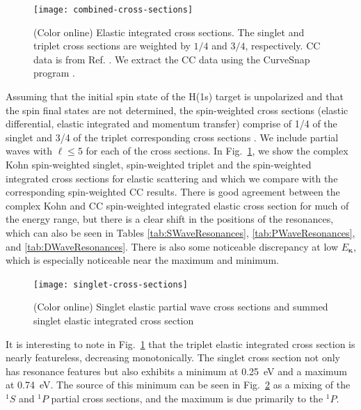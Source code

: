 \documentclass[preprint,showpacs,showkeys,preprintnumbers,amsmath,amssymb,longbibliography,pra,aps]{revtex4-1}
\begin{document}
\begin{figure}[H]
	\centering
	\texttt{[image: combined-cross-sections]}
	\caption{(Color online) Elastic integrated cross sections. The singlet and
triplet cross sections are weighted by $1/4$ and $3/4$,
respectively. CC data is from Ref. \cite{Walters2004}.
We extract the CC data using the
CurveSnap program \cite{CurveSnap}.}
	\label{fig:combined-cross-sections}
\end{figure}

Assuming that the initial spin state of the H(1s) target is unpolarized and 
that the spin final states are not determined, the spin-weighted cross 
sections (elastic differential, elastic integrated and momentum transfer) 
comprise of 1/4 of the singlet and 3/4 of the triplet corresponding cross 
sections \cite{Blackwood2002,Joachain1979,Ray1996}.
We include partial waves with $\ell \leq 5$ for each of the cross sections. 
In Fig.~\ref{fig:combined-cross-sections}, we show the complex Kohn
spin-weighted singlet, spin-weighted triplet and the spin-weighted integrated 
cross sections for elastic scattering and which we compare with the
corresponding spin-weighted CC results.
There is good agreement between the complex Kohn and CC spin-weighted
integrated elastic cross section for much of the energy range, but there is a 
clear shift in the positions of the resonances, which can also be seen in 
Tables \ref{tab:SWaveResonances}, \ref{tab:PWaveResonances}, and
\ref{tab:DWaveResonances}. There is also some noticeable discrepancy at low
$E_{\bm \kappa}$, which is especially noticeable near the maximum and minimum.

\begin{figure}[H]
	\centering
	\texttt{[image: singlet-cross-sections]}
	\caption{(Color online) Singlet elastic partial wave cross
sections and summed singlet elastic integrated cross section}
	\label{fig:singlet-cross-sections}
\end{figure}

It is interesting to note in Fig.~\ref{fig:combined-cross-sections} that the
triplet elastic integrated cross section is nearly featureless, decreasing
monotonically. The singlet cross section not only has resonance
features but also exhibits a minimum at 0.25~eV and a maximum at 0.74~eV.
The source of this minimum can be seen in
Fig.~\ref{fig:singlet-cross-sections} as a mixing of the $^1S$ and $^1P$
partial cross sections, and the maximum is due primarily to the $^1P$.
\end{document}
